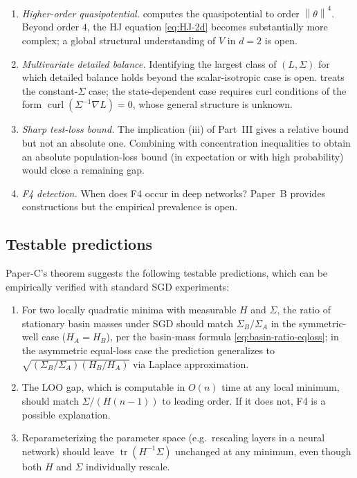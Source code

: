 \documentclass[11pt,a4paper]{article}
\theoremstyle{definition}
\theoremstyle{remark}
\DeclareMathOperator{\tr}{tr}
\DeclareMathOperator{\curl}{curl}
\newcommand{\norm}[1]{\left\|#1\right\|}
\begin{document}
\begin{enumerate}[leftmargin=2em]
\item \emph{Higher-order quasipotential.}   computes the
   quasipotential to order $\norm\theta^4$.  Beyond order $4$, the
   HJ equation \eqref{eq:HJ-2d} becomes substantially more complex; a
   global structural understanding of $V$ in $d=2$ is open.
\item \emph{Multivariate detailed balance.}  Identifying the largest
   class of $(L,\Sigma)$ for which detailed balance holds beyond the
   scalar-isotropic case is open.  \cite{ChaudhariSoatto2018} treats the
   constant-$\Sigma$ case; the state-dependent case requires curl
   conditions of the form $\curl(\Sigma^{-1}\nabla L)=0$, whose general
   structure is unknown.
\item \emph{Sharp test-loss bound.}  The implication (iii) of Part~III
   gives a relative bound but not an absolute one.  Combining
    with concentration inequalities to obtain an
   absolute population-loss bound (in expectation or with high probability)
   would close a remaining gap.
\item \emph{F4 detection.}  When does F4 occur in deep networks?  Paper~B
   \cite{paperB} provides constructions but the empirical prevalence is
   open.
\end{enumerate}

\subsection{Testable predictions}

Paper-C's theorem suggests the following testable predictions, which
can be empirically verified with standard SGD experiments:
\begin{enumerate}[leftmargin=2em]
\item For two locally quadratic minima with measurable $H$ and
   $\Sigma$, the ratio of stationary basin masses under SGD should
   match $\Sigma_B/\Sigma_A$ in the symmetric-well case ($H_A=H_B$),
   per the basin-mass formula \eqref{eq:basin-ratio-eqloss}; in the
   asymmetric equal-loss case the prediction generalizes to
   $\sqrt{(\Sigma_B/\Sigma_A)(H_B/H_A)}$ via Laplace approximation.
\item The LOO gap, which is computable in $O(n)$ time at any local
   minimum, should match $\Sigma/(H(n-1))$ to leading order.  If it does
   not, F4 is a possible explanation.
\item Reparameterizing the parameter space (e.g.\ rescaling layers in a
   neural network) should leave $\tr(H^{-1}\Sigma)$ unchanged at any
   minimum, even though both $H$ and $\Sigma$ individually rescale.
\end{enumerate}
\end{document}

